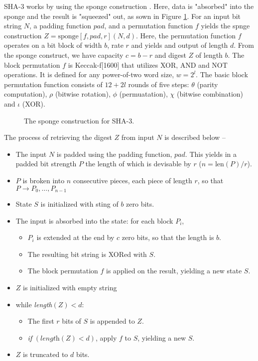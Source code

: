 \documentclass{article}
\begin{document}
SHA-3 works by using the sponge construction \cite{keccakKeccakTeam}. Here, data is "absorbed" into the sponge and the result is "squeezed" out, as sown in Figure \ref{fig:sponge}. For an input bit string $N$, a padding function $pad$, and a permutation function $f$ yields the spnge construction $Z=\text{sponge}[f,pad,r](N,d)$. Here, the permutation function $f$ operates on a bit block of width $b$, rate $r$ and yields and output of length $d$. From the sponge construct, we have capacity $c=b-r$ and digest $Z$ of length $b$. The block permutation $f$ is Keccak-f[1600] that utilizes XOR, AND and NOT operations. It is defined for any power-of-two word size, $w=2^l$. The basic block permutation function consists of $12+2l$ rounds of five steps: $\theta$ (parity computation), $\rho$ (bitwise rotation), $\phi$ (permuatation), $\chi$ (bitwise combination) and $\iota$ (XOR).

\begin{figure}[!h]
    \centering
    
    \caption{The sponge construction for SHA-3.}
    \label{fig:sponge}
\end{figure}

The process of retrieving the digest $Z$ from input $N$ is described below --
\begin{itemize}
    \item The input $N$ is padded using the padding function, $pad$. This yields in a padded bit strength $P$ the length of which is devisable by $r$ ($n=\text{len}(P)/r$).
    \item $P$ is broken into $n$ consecutive pieces, each piece of length $r$, so that $P \to P_{0},\ldots,P_{n-1}$
    \item State $S$ is initialized with sting of $b$ zero bits.
    \item The input is absorbed into the state: for each block $P_{i}$, \begin{itemize}
              \item $P_{i}$ is extended at the end by $c$ zero bits, so that the length is $b$.
              \item The resulting bit string is XORed with $S$.
              \item The block permutation $f$ is applied on the result, yielding a new state $S$.
          \end{itemize}
    \item $Z$ is initialized with empty string
    \item while \textit{length}$(Z)<d$:\begin{itemize}
              \item The first $r$ bits of $S$ is appended to $Z$.
              \item \textit{if} $(\textit{length}(Z)<d)$, apply $f$ to $S$, yielding a new $S$.
          \end{itemize}
    \item $Z$ is truncated to $d$ bits.
\end{itemize}
\end{document}
